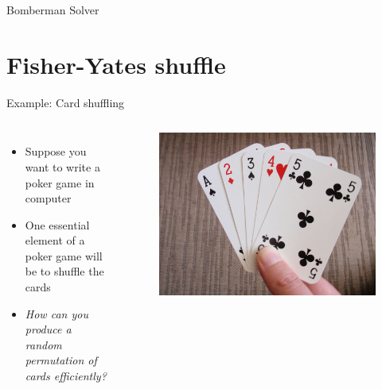 \documentclass[10pt,xcolor={table,dvipsnames},t]{beamer}
\begin{document}
\begin{frame}{}
  \begin{algorithm}[H]
    \caption{Bomberman Solver}\label{alg:bomberman_solver}
    \begin{algorithmic}[1]

        \EndIf
      \EndIf
    \EndFor
    \end{algorithmic}
  \end{algorithm}
\end{frame}

\section{Fisher-Yates shuffle}
\begin{frame}{Example: Card shuffling}
  \begin{columns}
    \begin{itemize}
      \item Suppose you want to write a poker game in computer
      \item One essential element of a poker game will be to shuffle the cards
      \item \textit{How can you produce a random permutation of cards efficiently?}
    \end{itemize}
    \begin{figure}
      \includegraphics[width=\textwidth]{./img/poker_cards.JPG}
    \end{figure}
  \end{columns}
\end{frame}
\end{document}
